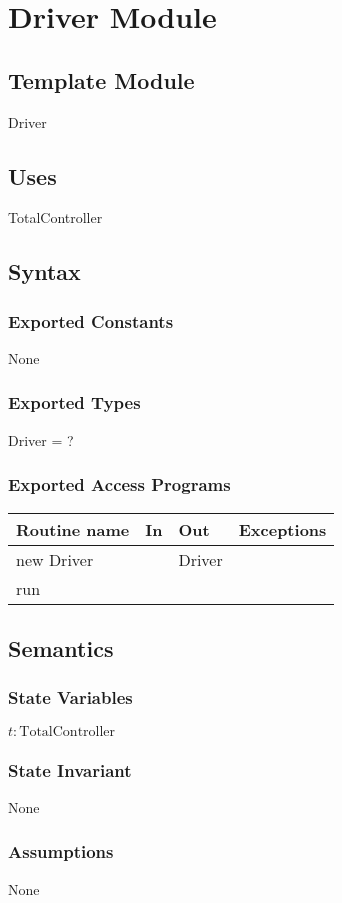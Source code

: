 \documentclass[12pt]{article}
\begin{document}
\section{Driver Module}

\subsection*{Template Module}
Driver

\subsection*{Uses}
TotalController

\subsection*{Syntax}
\subsubsection*{Exported Constants}
None
\subsubsection*{Exported Types}
Driver = ?
\subsubsection*{Exported Access Programs}
\begin{tabular}{| l | l | l | p{5cm} |}
\hline
\textbf{Routine name} & \textbf{In} & \textbf{Out} & \textbf{Exceptions}\\
\hline
new Driver &  & Driver & \\
\hline
run & &  & \\
\hline
\end{tabular}

\subsection*{Semantics}
\subsubsection*{State Variables}
$t : \text{TotalController}$
\subsubsection*{State Invariant}
None
\subsubsection*{Assumptions}
None
\end{document}
